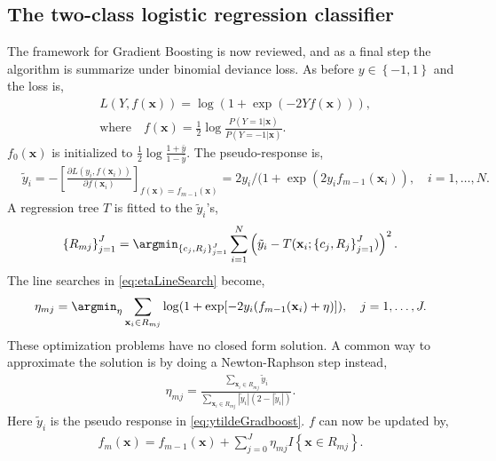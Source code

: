 \subsection{The two-class logistic regression classifier}
\label{sub:The two-class logistic regression classifier}
The framework for Gradient Boosting is now reviewed, and as a final step the algorithm is summarize under binomial deviance loss. As before $y \in \left\{ -1, 1 \right\}$ and the loss is,
\begin{align}
  &L(Y, f(\mathbf{x})) = \log (1 + \exp (-2 Y f(\mathbf{x}))),\\
  &\text{where} \quad f(\mathbf{x}) = \frac{1}{2} \log \frac{ P(Y = 1 | \mathbf{x})}{ P(Y = -1 | \mathbf{x})}  .
\end{align}
$f_0(\mathbf{x})$ is initialized to $\frac{1}{2} \log \frac{1+\bar{y}}{1-\bar{y}}$.  The pseudo-response is,
\begin{align}
  \label{eq:ytildeGradboost} 
  &\tilde{y}_i = 
  -\left[ \frac{\partial L(y_i, f(\mathbf{x}_i)) }{\partial f(\mathbf{x}_i)}  \right]_{f(\mathbf{x}) = f_{m-1}(\mathbf{x})}
  = 2 y_i / (1 + \exp \left( 2 y_i f_{m-1}(\mathbf{x}_i) \right), \quad i = 1, \ldots, N.
\end{align}
A regression tree $T$ is fitted to the $\tilde y_i$'s,
\begin{align}
  \left\{ R_{m j} \right\}_{j = 1}^J  = 
  \argmin_{\left\{ c_j, R_{j} \right\}_{j = 1}^J} \sum^{N}_{i=1} \left( \tilde y_i - T(\mathbf{x}_i; \left\{ c_j, R_j \right\}_{j = 1}^J) \right)^2.
\end{align}
The line searches in \eqref{eq:etaLineSearch} become,
\begin{align}
  \eta_{m j} = \argmin_\eta  \sum_{\mathbf{x}_i \in R_{m j}} \log (1 + \exp [-2 y_i (f_{m-1}(\mathbf{x}_i) + \eta) ]), \quad j = 1, \ldots, J.
\end{align}
These optimization problems have no closed form solution. A common way to approximate the solution is by doing a Newton-Raphson step instead,
\begin{align}
  \eta_{m j} =  \frac{\sum_{\mathbf{x}_i \in R_{m j}} \tilde y_i}{\sum_{\mathbf{x}_i \in R_{m j}} |\tilde y_i|(2-|\tilde y_i|)}.
\end{align}
Here  $\tilde y_i$ is the pseudo response in \eqref{eq:ytildeGradboost}. $f$ can now be updated by,
\begin{align}
  \label{eq:gradBoostUpdateF} 
  f_m(\mathbf{x}) = f_{m-1}(\mathbf{x}) +  \sum^{J}_{j=0} \eta_{m j} I\left\{ \mathbf{x} \in R_{m j} \right\}.
\end{align}
